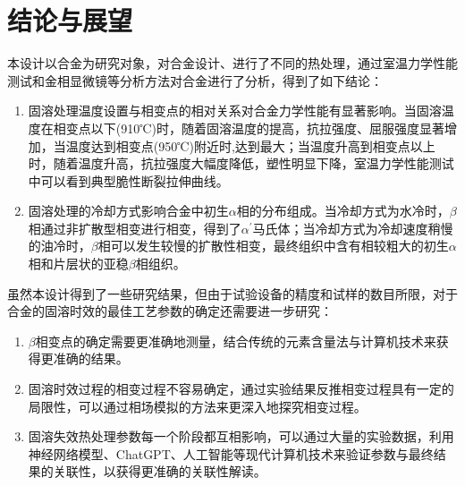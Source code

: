 \chapter{结论与展望}
本设计以\ti 合金为研究对象，对合金设计、进行了不同的热处理，通过室温力学性能测试和金相显微镜等分析方法对合金进行了分析，得到了如下结论：

\begin{enumerate}
	\item 固溶处理温度设置与相变点的相对关系对合金力学性能有显著影响。当固溶温度在相变点以下(910℃)时，随着固溶温度的提高，抗拉强度、屈服强度显著增加，当温度达到相变点(950℃)附近时,达到最大；当温度升高到相变点以上时，随着温度升高，抗拉强度大幅度降低，塑性明显下降，室温力学性能测试中可以看到典型脆性断裂拉伸曲线。
	\item 固溶处理的冷却方式影响合金中初生$ \alpha $相的分布组成。当冷却方式为水冷时，$ \beta $相通过非扩散型相变进行相变，得到了$ \alpha^{\prime} $马氏体；当冷却方式为冷却速度稍慢的油冷时，$ \beta $相可以发生较慢的扩散性相变，最终组织中含有相较粗大的初生$ \alpha $相和片层状的亚稳$ \beta $相组织。
\end{enumerate}

虽然本设计得到了一些研究结果，但由于试验设备的精度和试样的数目所限，对于\ti 合金的固溶时效的最佳工艺参数的确定还需要进一步研究：
\begin{enumerate}
	\item $ \beta $相变点的确定需要更准确地测量，结合传统的元素含量法与计算机技术来获得更准确的结果。
	\item 固溶时效过程的相变过程不容易确定，通过实验结果反推相变过程具有一定的局限性，可以通过相场模拟的方法来更深入地探究相变过程。
	\item 固溶失效热处理参数每一个阶段都互相影响，可以通过大量的实验数据，利用神经网络模型、ChatGPT、人工智能等现代计算机技术来验证参数与最终结果的关联性，以获得更准确的关联性解读。
\end{enumerate}